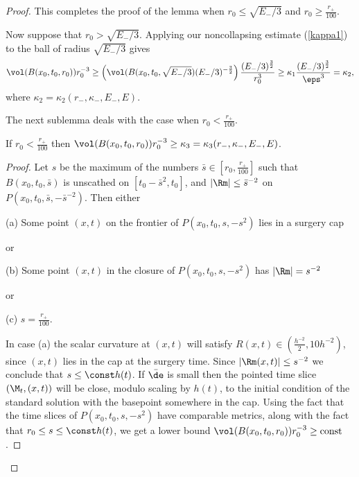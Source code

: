 \begin{proof}
This completes the proof of the lemma when
$r_0\leq \sqrt{E_-/3}$
and $r_0\geq \frac{r_+}{100}$.

Now suppose that $r_0>\sqrt{E_-/3}$.  Applying our
noncollapsing estimate (\ref{kappa1}) to the ball of radius
$\sqrt{E_-/3}$ gives
\begin{equation}
\vol(B(x_0,t_0,r_0))r_0^{-3}\geq \left(\vol(B(x_0,t_0,\sqrt{E_-/3}) (E_-/3)^{-\frac32}
\right)\frac{(E_-/3)^{\frac32}}{r_0^3}
\geq \kappa_1\frac{(E_-/3)^{\frac32}}{\eps^3}=\kappa_2,
\end{equation}
where $\kappa_2=\kappa_2(r_-,\kappa_-,E_-,E)$.

The next sublemma deals with the case when $r_0< \frac{r_+}{100}$.
\begin{lemma}
  \label{lem:kl-establishing-noncollapsing-presence-surgery-kappa-solutions-lemma}

\label{r0/100}
If $r_0< \frac{r_+}{100}$ then $\vol(B(x_0,t_0,r_0))r_0^{-3}\geq
\kappa_3=\kappa_3(r_-,\kappa_-,E_-,E)$.
\end{lemma}
\begin{proof}
Let $s$ be the maximum of the numbers $\bar s\in [r_0,\frac{r_+}{100}]$
such that $B(x_0,t_0,\bar s)$ is unscathed on $[t_0-\bar s^2,t_0]$,
and $|\Rm|\leq \bar s^{-2}$ on $P(x_0,t_0,\bar s,-\bar s^{-2})$.
Then  either

(a) Some point $(x,t)$ on the frontier of $P(x_0,t_0,s,-s^2)$
lies in a surgery cap

or

(b) Some point $(x,t)$ in the closure of $P(x_0,t_0,s,-s^2)$
has $|\Rm|=s^{-2}$


or

(c) $s=\frac{r_+}{100}$.

In case (a) the scalar curvature
at $(x,t)$ will satisfy $R(x,t)\in (\frac{h^{-2}}{2},10h^{-2})$,
since $(x,t)$ lies in the cap at the surgery time.  Since
$|\Rm(x,t)|\leq s^{-2}$ we conclude that $s \le \const h(t)$.
If $\bar\de$ is small then the pointed time slice
$(\M_t,(x,t))$ will be close, modulo scaling by $h(t)$, to
the initial condition of the standard solution with
the basepoint somewhere in the cap.  Using the
fact that the time slices of $P(x_0,t_0,s,-s^2)$ have
comparable metrics, along with the fact that
$r_0 \le s  \le \const h(t)$, we get a lower bound
$\vol(B(x_0,t_0,r_0))r_0^{-3}\geq \mbox{const}$.


\end{proof}
\end{proof}
